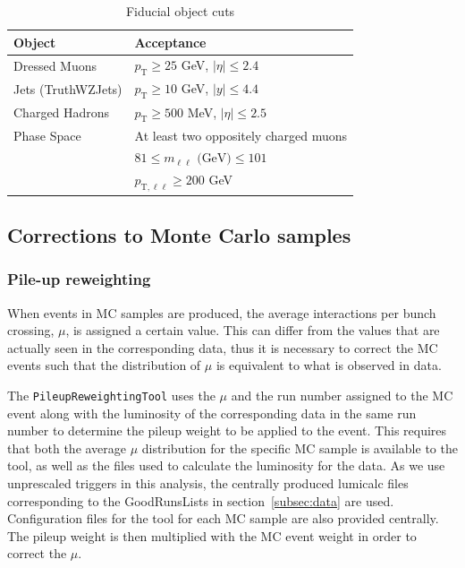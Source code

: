 \begin{table}[h!]
    \centering
    \begin{tabular}{l|l}
    \hline
    \textbf{Object} & \textbf{Acceptance} \\ \hline
    Dressed Muons & $p_\text{T} \geq 25$ GeV, $|\eta| \leq 2.4$ \\\hline
    Jets (TruthWZJets) & $p_\text{T}\geq 10$ GeV, $|y|\leq4.4$ \\\hline
    Charged Hadrons & $p_\text{T} \geq 500$ MeV, $|\eta| \leq 2.5$  \\ \hline
    Phase Space & At least two oppositely charged muons \\
    & $81\leq m_{\ell\ell} \text{ (GeV)}\leq101$ \\
    & $p_{\text{T},\ell\ell}\geq200$ GeV \\ \hline
    \end{tabular}
    \caption{Fiducial object cuts}
    \label{tab:PLObjCuts}
\end{table}

\subsection{Corrections to Monte Carlo samples}
\label{subsec:MCCorr}
\subsubsection{Pile-up reweighting}
When events in MC samples are produced, the average interactions per bunch crossing, $\mu$, is assigned a certain value. This can differ from the values that are actually seen in the corresponding data, thus it is
necessary to correct the MC events such that the distribution of $\mu$ is equivalent to what is observed in data.

The \texttt{PileupReweightingTool} uses the $\mu$ and the run number assigned to the MC event along with the luminosity of the corresponding data in the same run number to determine the pileup weight to be applied to the event.
This requires that both the average $\mu$ distribution for the specific MC sample is available to the tool, as well as the files used to calculate the luminosity for the data. As we use unprescaled triggers in this analysis, the centrally produced lumicalc files corresponding to the GoodRunsLists in section~\ref{subsec:data} are used.
Configuration files for the tool for each MC sample are also provided centrally.
The pileup weight is then multiplied with the MC event weight in order to correct the $\mu$.

